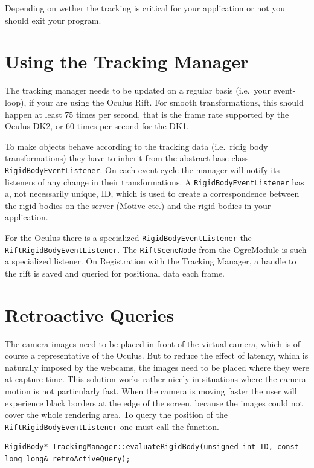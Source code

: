 \documentclass[]{article}
\begin{document}
Depending on wether the tracking is critical for your application or not
you should exit your program.

\section{Using the Tracking Manager}\label{using-the-tracking-manager}

The tracking manager needs to be updated on a regular basis (i.e.~your
event-loop), if your are using the Oculus Rift. For smooth
transformations, this should happen at least 75 times per second, that
is the frame rate supported by the Oculus DK2, or 60 times per second
for the DK1.

To make objects behave according to the tracking data (i.e.~ridig body
transformations) they have to inherit from the abstract base class
\texttt{RigidBodyEventListener}. On each event cycle the manager will
notify its listeners of any change in their transformations. A
\texttt{RigidBodyEventListener} has a, not necessarily unique, ID, which
is used to create a correspondence between the rigid bodies on the
server (Motive etc.) and the rigid bodies in your application.

For the Oculus there is a specialized \texttt{RigidBodyEventListener}
the \texttt{RiftRigidBodyEventListener}. The \texttt{RiftSceneNode} from
the
\href{https://github.com/ands/OculusMeetsAR/wiki/Ogre-Module}{OgreModule}
is such a specialized listener. On Registration with the Tracking
Manager, a handle to the rift is saved and queried for positional data
each frame.

\section{Retroactive Queries}\label{retroactive-queries}

The camera images need to be placed in front of the virtual camera,
which is of course a representative of the Oculus. But to reduce the
effect of latency, which is naturally imposed by the webcams, the images
need to be placed where they were at capture time. This solution works
rather nicely in situations where the camera motion is not particularly
fast. When the camera is moving faster the user will experience black
borders at the edge of the screen, because the images could not cover
the whole rendering area. To query the position of the
\texttt{RiftRigidBodyEventListener} one must call the function.

\begin{verbatim}
RigidBody* TrackingManager::evaluateRigidBody(unsigned int ID, const long long& retroActiveQuery);
\end{verbatim}
\end{document}
